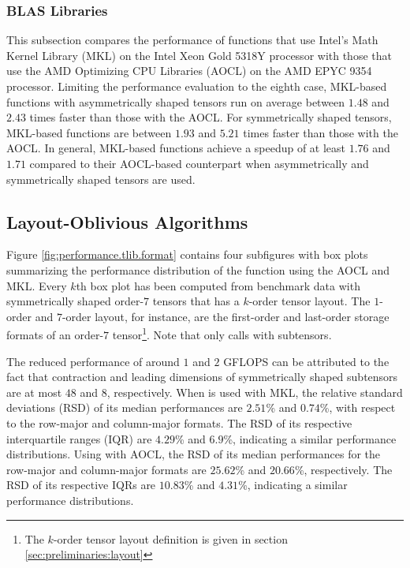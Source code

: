 \subsubsection{BLAS Libraries}
This subsection compares the performance of functions that use Intel's Math Kernel Library (MKL) on the Intel Xeon Gold 5318Y processor with those that use the AMD Optimizing CPU Libraries (AOCL) on the AMD EPYC 9354 processor. 
Limiting the performance evaluation to the eighth case, MKL-based functions with asymmetrically shaped tensors run on average between $1.48$ and $2.43$ times faster than those with the AOCL.
For symmetrically shaped tensors, MKL-based functions are between $1.93$ and $5.21$ times faster than those with the AOCL.
In general, MKL-based functions achieve a speedup of at least $1.76$ and $1.71$ compared to their AOCL-based counterpart when asymmetrically and symmetrically shaped tensors are used.


\subsection{Layout-Oblivious Algorithms}
Figure \ref{fig:performance.tlib.format} contains four subfigures with box plots summarizing the performance distribution of the  function using the AOCL and MKL.
Every $k$th box plot has been computed from benchmark data with symmetrically shaped order-$7$ tensors that has a $k$-order tensor layout.
The $1$-order and $7$-order layout, for instance, are the first-order and last-order storage formats of an order-$7$ tensor\footnote{The $k$-order tensor layout definition is given in section \ref{sec:preliminaries:layout}}.
Note that  only calls  with subtensors.

The reduced performance of around $1$ and $2$ GFLOPS can be attributed to the fact that contraction and leading dimensions of symmetrically shaped subtensors are at most $48$ and $8$, respectively.
When  is used with MKL, the relative standard deviations (RSD) of its median performances are $2.51$\% and $0.74$\%, with respect to the row-major and column-major formats.
The RSD of its respective interquartile ranges (IQR) are $4.29$\% and $6.9$\%, indicating a similar performance distributions.
Using  with AOCL, the RSD of its median performances for the row-major and column-major formats are $25.62$\% and $20.66$\%, respectively.
The RSD of its respective IQRs are $10.83$\% and $4.31$\%, indicating a similar performance distributions.

